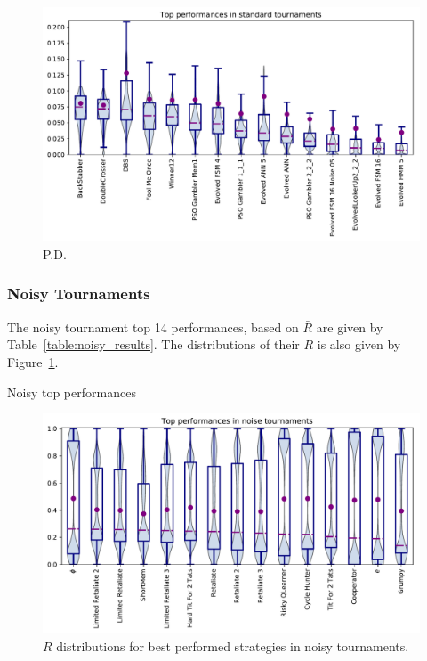 \documentclass{article}
\begin{document}
\begin{figure}[h!]
    \centering
    \includegraphics[width=\textwidth]{../images/performance_standard.pdf}
    \caption{P.D.}\label{fig:std_results}
\end{figure}


\newpage
\subsubsection{Noisy Tournaments}

The noisy tournament top 14 performances, based on \(\bar{R}\) are given
by Table~\ref{table:noisy_results}. The distributions of their \(R\) is also
given by Figure~\ref{fig:std_results}.


\begin{table}
    \begin{center}
    
    \caption{Noisy top performances}\label{table:noisy_results}
    \end{center}
\end{table}

\begin{figure}
    \centering
    \includegraphics[width=.9\textwidth]{../images/performance_noise.pdf}
    \caption{\(R\) distributions for best performed strategies in noisy tournaments.}
\end{figure}
\end{document}
